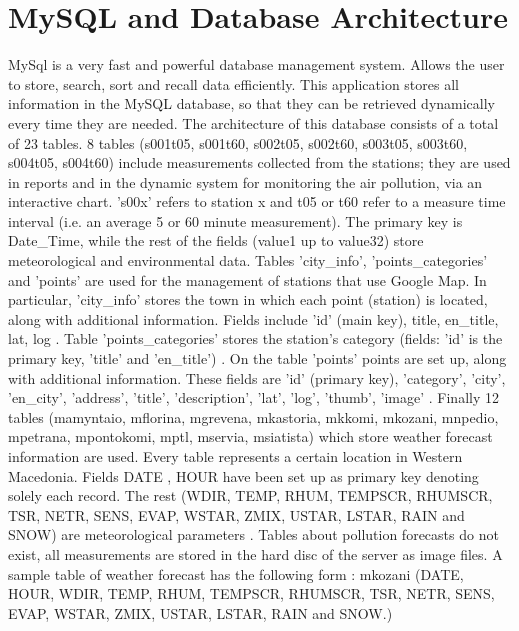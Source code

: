 \documentclass[conference]{IEEEtran}
\begin{document}
\section{MySQL and Database Architecture}
MySql is a very fast and powerful database management system. Allows the user to store, search, sort and recall data efficiently. This application stores all information in the MySQL database, so that they can be retrieved  dynamically every time they are needed. The architecture of this database consists of a total of 23 tables. 8 tables (s001t05, s001t60, s002t05, s002t60, s003t05, s003t60, s004t05, s004t60) include measurements collected from the stations; they are used in reports and in the dynamic system for monitoring the air pollution, via an interactive chart. 's00x' refers to station x and t05 or t60 refer to a measure time interval (i.e. an average 5 or 60 minute measurement). The primary key is Date\_Time, while the rest of the fields (value1 up to value32)  store meteorological and environmental data.  Tables 'city\_info', 'points\_categories' and 'points' are used for the management of stations that use Google Map. In particular, 'city\_info' stores the town in which each point (station) is located, along with additional information. Fields include 'id' (main key), title, en\_title, lat, log . Table 'points\_categories' stores the station's category (fields: 'id' is the primary key, 'title' and 'en\_title') .  On the table 'points'  points are set up, along with additional information. These fields are 'id' (primary key), 'category', 'city', 'en\_city', 'address',  'title', 'description', 'lat', 'log', 'thumb', 'image' .  Finally 12 tables  (mamyntaio, mflorina, mgrevena, mkastoria, mkkomi, mkozani, mnpedio, mpetrana, mpontokomi, mptl, mservia, msiatista) which store weather forecast information are used.  Every table represents a certain location in Western Macedonia. Fields DATE , HOUR  have been set up as primary key denoting solely each record. The rest (WDIR, TEMP, RHUM, TEMPSCR, RHUMSCR, TSR, NETR, SENS, EVAP, WSTAR, ZMIX, USTAR, LSTAR, RAIN and SNOW) are meteorological parameters . Tables about pollution forecasts do not exist, all measurements are stored in the hard disc of the server as image files. A sample table of weather forecast has the following form : 
mkozani (DATE, HOUR, WDIR, TEMP, RHUM, TEMPSCR, RHUMSCR,  TSR,  NETR, SENS,  EVAP, WSTAR, ZMIX, USTAR, LSTAR, RAIN and SNOW.)
\end{document}
